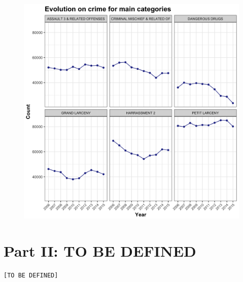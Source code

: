 \documentclass{article}
\begin{document}
\begin{figure}[H]
\centering
\includegraphics[scale=0.15]{7_MainCatsOverTime.png}
\end{figure}

\pagebreak
\section{Part II: TO BE DEFINED}


\begin{verbatim}
[TO BE DEFINED]
\end{verbatim}



\newpage
\printbibliography 
\end{document}
